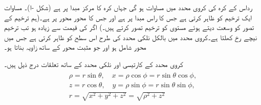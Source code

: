 رداس  کے کرہ کی کروی محدد میں  مساوات  ہو گی  جہاں کرہ کا مرکز مبدا پر ہے (شکل -ا)۔ مساوات  ایک ترخیم کو ظاہر کرتی ہے جس کا راس مبدا پر ہے اور جس کا محور  محور پر ہے۔(ہم ترخیم کے تصور کو وسعت دیتے ہوئے مستوی  کو ترخیم  تصور کرتے ہیں۔) اگر  کی قیمت  سے زیادہ ہو تب ترخیم نیچے رخ کھلتا ہے۔کروی محدد میں بالکل نلکی محدد کی طرح   اس سطح کو ظاہر کرتی ہے جس میں محور  شامل ہو اور  جو مثبت  محور کے ساتھ زاویہ  بناتا ہو۔

کروی محدد کے کارتیسی اور نلکی محدد کے ساتھ تعلقات   درج ذیل ہیں۔
\begin{gather}
\begin{aligned}\label{مساوات_سمتیہ_کروی_محدد_تعلقات}
\rho=r\sin\theta,\quad x=\rho\cos\phi=r\sin\theta\cos\phi,\\
z=r\cos\theta,\quad y=\rho\sin\phi=r\sin\theta\sin\phi,\\
r=\sqrt{x^2+y^2+z^2}=\sqrt{\rho^2+z^2}
\end{aligned}
\end{gather}

